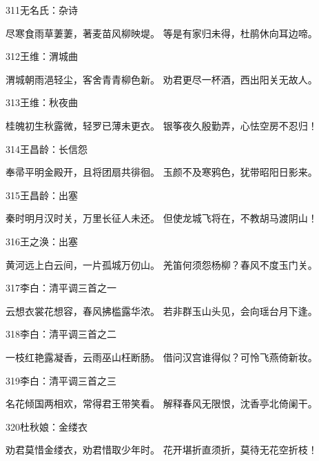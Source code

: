 311无名氏：杂诗

尽寒食雨草萋萋，著麦苗风柳映堤。
等是有家归未得，杜鹃休向耳边啼。

312王维：渭城曲

渭城朝雨浥轻尘，客舍青青柳色新。
劝君更尽一杯酒，西出阳关无故人。

313王维：秋夜曲

桂魄初生秋露微，轻罗已薄未更衣。
银筝夜久殷勤弄，心怯空房不忍归！

314王昌龄：长信怨

奉帚平明金殿开，且将团扇共徘徊。
玉颜不及寒鸦色，犹带昭阳日影来。

315王昌龄：出塞

秦时明月汉时关，万里长征人未还。
但使龙城飞将在，不教胡马渡阴山！

316王之涣：出塞

黄河远上白云间，一片孤城万仞山。
羌笛何须怨杨柳？春风不度玉门关。

317李白：清平调三首之一

云想衣裳花想容，春风拂槛露华浓。
若非群玉山头见，会向瑶台月下逢。

318李白：清平调三首之二

一枝红艳露凝香，云雨巫山枉断肠。
借问汉宫谁得似？可怜飞燕倚新妆。

319李白：清平调三首之三

名花倾国两相欢，常得君王带笑看。
解释春风无限恨，沈香亭北倚阑干。

320杜秋娘：金缕衣

劝君莫惜金缕衣，劝君惜取少年时。
花开堪折直须折，莫待无花空折枝！